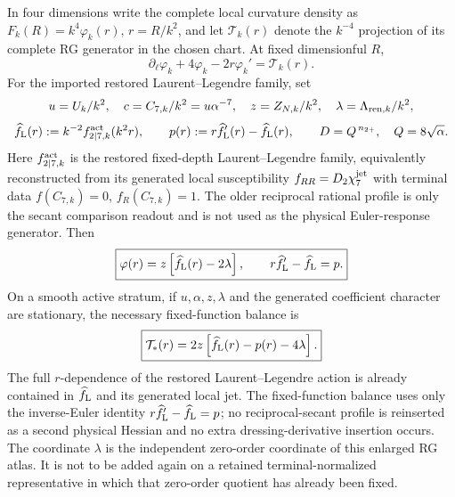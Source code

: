 \documentclass[12pt,a4paper]{article}
\begin{document}
\begin{theorem}
\label{p12:thm:v199-rgas-laurent-balance}
In four dimensions write the complete local curvature density as
\(F_k(R)=k^4\varphi_k(r)\), \(r=R/k^2\), and let
\(\mathcal T_k(r)\) denote the \(k^{-4}\) projection of its complete RG
generator in the chosen chart.  At fixed dimensionful \(R\),
\begin{equation}
\label{p12:eq:v199-rgas-fixed-function}
 \partial_\ell\varphi_k+4\varphi_k-2r\varphi_k'=\mathcal T_k(r).
\end{equation}
For the imported restored Laurent--Legendre family, set
\[
 u=U_k/k^2,\quad c=C_{7,k}/k^2=u\alpha^{-7},\quad
 z=Z_{N,k}/k^2,\quad \lambda=\Lambda_{{\rm ren},k}/k^2,
\]
\[
 \widehat f_{\rm L}(r):=k^{-2}f^{\rm act}_{2\mid7,k}(k^2r),\qquad
 p(r):=r\widehat f_{\rm L}'(r)-\widehat f_{\rm L}(r),
 \qquad D=Q^{\,n_{2+}},\quad Q=8\sqrt\alpha .
\]
Here \(f^{\rm act}_{2\mid7,k}\) is the restored fixed-depth
Laurent--Legendre family, equivalently reconstructed from its generated local
susceptibility \(f_{RR}=D_2\chi_7^{\rm jet}\) with terminal data
\(f(C_{7,k})=0\), \(f_R(C_{7,k})=1\).  The older reciprocal rational
profile is only the secant comparison readout and is not used as the physical
Euler-response generator.
Then
\begin{equation}
\label{p12:eq:v199-rgas-laurent-profile}
 \boxed{\varphi(r)=z\left[\widehat f_{\rm L}(r)-2\lambda\right],
 \qquad r\widehat f_{\rm L}'-\widehat f_{\rm L}=p.}
\end{equation}
On a smooth active stratum, if \(u,\alpha,z,\lambda\) and the generated
coefficient character are stationary, the necessary fixed-function balance is
\begin{equation}
\label{p12:eq:v199-rgas-laurent-balance}
 \boxed{\mathcal T_*(r)
 =2z\left[\widehat f_{\rm L}(r)-p(r)-4\lambda\right].}
\end{equation}
The full \(r\)-dependence of the restored Laurent--Legendre action is already
contained in \(\widehat f_{\rm L}\) and its generated local jet.  The
fixed-function balance uses only the inverse-Euler identity
\(r\widehat f_{\rm L}'-\widehat f_{\rm L}=p\); no reciprocal-secant profile
is reinserted as a second physical Hessian and no extra dressing-derivative
insertion occurs.
The coordinate \(\lambda\) is the independent zero-order coordinate of this
enlarged RG atlas.  It is not to be added again on a retained
terminal-normalized representative in which that zero-order quotient has
already been fixed.
\end{theorem}
\end{document}
